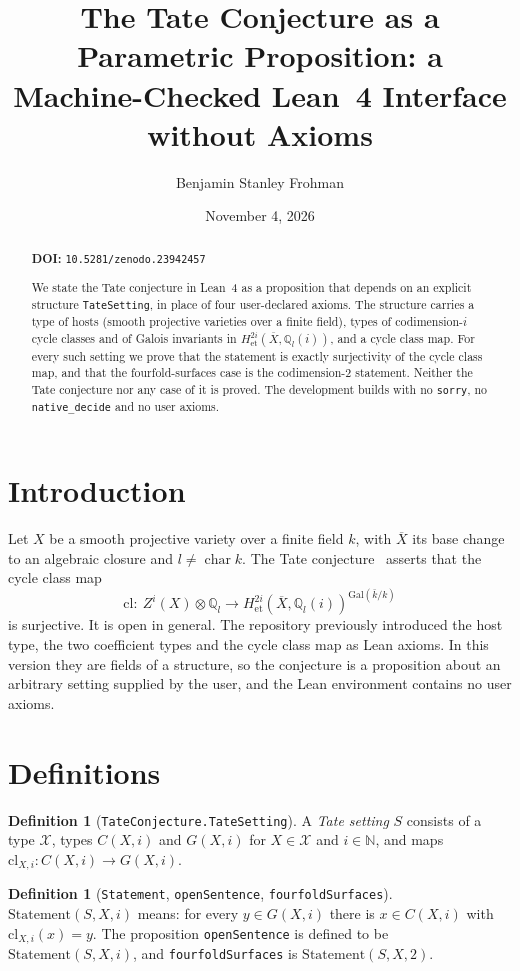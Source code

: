 \documentclass[11pt]{amsart}
\title[TateConjecture]{The Tate Conjecture as a Parametric Proposition: a Machine-Checked Lean~4 Interface without Axioms}
\author{Benjamin Stanley Frohman}
\date{November 4, 2026}
\theoremstyle{definition}
\newtheorem{definition}[theorem]{Definition}
\theoremstyle{remark}
\begin{document}
\begin{abstract}
\noindent\textbf{DOI:} \texttt{10.5281/zenodo.23942457}\par\smallskip

We state the Tate conjecture in Lean~4 as a proposition that depends on an explicit structure \texttt{TateSetting}, in place of four user-declared axioms. The structure carries a type of hosts (smooth projective varieties over a finite field), types of codimension-$i$ cycle classes and of Galois invariants in $H^{2i}_{\mathrm{et}}(\overline X,\mathbb Q_l(i))$, and a cycle class map. For every such setting we prove that the statement is exactly surjectivity of the cycle class map, and that the fourfold-surfaces case is the codimension-2 statement. Neither the Tate conjecture nor any case of it is proved. The development builds with no \texttt{sorry}, no \texttt{native\_decide} and no user axioms.
\end{abstract}
\maketitle
{}\par


\section{Introduction}
Let $X$ be a smooth projective variety over a finite field $k$, with $\overline X$ its base change to an algebraic closure and $l\ne\operatorname{char}k$. The Tate conjecture~\cite{tate} asserts that the cycle class map
\[ \mathrm{cl}:\ Z^i(X)\otimes\mathbb Q_l\to H^{2i}_{\mathrm{et}}(\overline X,\mathbb Q_l(i))^{\mathrm{Gal}(\bar k/k)} \]
is surjective. It is open in general. The repository previously introduced the host type, the two coefficient types and the cycle class map as Lean axioms. In this version they are fields of a structure, so the conjecture is a proposition about an arbitrary setting supplied by the user, and the Lean environment contains no user axioms.

\section{Definitions}
\begin{definition}[\texttt{TateConjecture.TateSetting}]
A \emph{Tate setting} $S$ consists of a type $\mathcal X$, types $C(X,i)$ and $G(X,i)$ for $X\in\mathcal X$ and $i\in\mathbb N$, and maps $\mathrm{cl}_{X,i}:C(X,i)\to G(X,i)$.
\end{definition}
\begin{definition}[\texttt{Statement}, \texttt{openSentence}, \texttt{fourfoldSurfaces}]
$\mathrm{Statement}(S,X,i)$ means: for every $y\in G(X,i)$ there is $x\in C(X,i)$ with $\mathrm{cl}_{X,i}(x)=y$. The proposition \texttt{openSentence} is defined to be $\mathrm{Statement}(S,X,i)$, and \texttt{fourfoldSurfaces} is $\mathrm{Statement}(S,X,2)$.
\end{definition}
\end{document}
